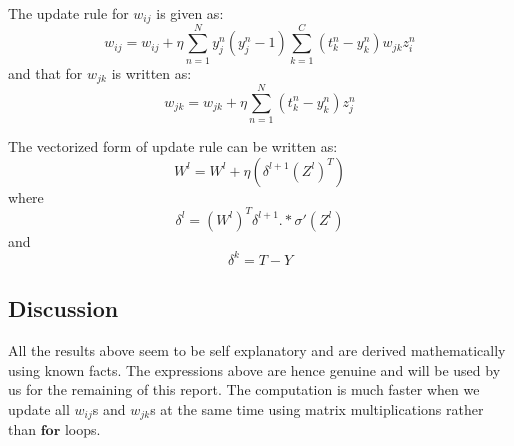 \documentclass{article}
\begin{document}
The update rule for $w_{ij}$ is given as:
$$
w_{ij} = w_{ij} + \eta \sum_{n=1}^{N} y_{j}^{n}(y_{j}^{n} - 1) \sum_{k=1}^{C}  (t_{k}^{n} - y_{k}^{n}) w_{jk} z_{i}^{n}
$$
and that for $w_{jk}$ is written as:
$$
w_{jk} = w_{jk} + \eta \sum_{n=1}^{N} (t_{k}^{n} - y_{k}^{n}) z_{j}^{n}
$$

The vectorized form of update rule can be written as:
$$
W^{l} = W^{l} + \eta(\delta^{l+1}(Z^l)^T)
$$
where
$$
\delta^{l} = (W^{l})^T \delta^{l+1} .* \sigma'(Z^l)
$$
and 
$$
\delta^{k} = T - Y
$$
\subsection{Discussion}
All the results above seem to be self explanatory and are derived mathematically using known facts. The expressions above are hence genuine and will be used by us for the remaining of this report. The computation is much faster when we update all $w_{ij}$s and $w_{jk}$s at the same time using matrix multiplications rather than $\textbf{for}$ loops. 
\newpage
\end{document}
